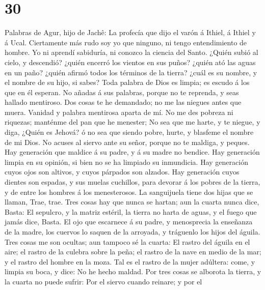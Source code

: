 \hypertarget{section-29}{%
\section{30}\label{section-29}}

 Palabras de Agur, hijo de Jachê: La profecía que dijo el
varón á Ithiel, á Ithiel y á Ucal.  Ciertamente más rudo soy
yo que ninguno, ni tengo entendimiento de hombre.  Yo ni
aprendí sabiduría, ni conozco la ciencia del Santo.  ¿Quién
subió al cielo, y descendió? ¿quién encerró los vientos en sus puños?
¿quién ató las aguas en un paño? ¿quién afirmó todos los términos de la
tierra? ¿cuál es su nombre, y el nombre de su hijo, si sabes?
 Toda palabra de Dios es limpia; es escudo á los que en él
esperan.  No añadas á sus palabras, porque no te reprenda, y
seas hallado mentiroso.  Dos cosas te he demandado; no me
las niegues antes que muera.  Vanidad y palabra mentirosa
aparta de mí. No me des pobreza ni riquezas; manténme del pan que he
menester;  No sea que me harte, y te niegue, y diga, ¿Quién
es Jehová? ó no sea que siendo pobre, hurte, y blasfeme el nombre de mi
Dios.  No acuses al siervo ante su señor, porque no te
maldiga, y peques.  Hay generación que maldice á su padre,
y á su madre no bendice.  Hay generación limpia en su
opinión, si bien no se ha limpiado su inmundicia.  Hay
generación cuyos ojos son altivos, y cuyos párpados son alzados.
 Hay generación cuyos dientes son espadas, y sus muelas
cuchillos, para devorar á los pobres de la tierra, y de entre los
hombres á los menesterosos.  La sanguijuela tiene dos hijas
que se llaman, Trae, trae. Tres cosas hay que nunca se hartan; aun la
cuarta nunca dice, Basta:  El sepulcro, y la matriz
estéril, la tierra no harta de aguas, y el fuego que jamás dice, Basta.
 El ojo que escarnece á su padre, y menosprecia la
enseñanza de la madre, los cuervos lo saquen de la arroyada, y tráguenlo
los hijos del águila.  Tres cosas me son ocultas; aun
tampoco sé la cuarta:  El rastro del águila en el aire; el
rastro de la culebra sobre la peña; el rastro de la nave en medio de la
mar; y el rastro del hombre en la moza.  Tal es el rastro
de la mujer adúltera: come, y limpia su boca, y dice: No he hecho
maldad.  Por tres cosas se alborota la tierra, y la cuarta
no puede sufrir:  Por el siervo cuando reinare; y por el

